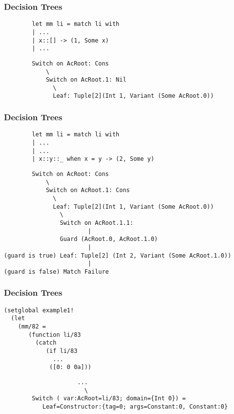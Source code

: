 \documentclass{beamer}
\begin{document}
\begin{frame}[fragile]
  \frametitle{Decision Trees}
  \begin{small}
    \hspace{-1em}
    \begin{minipage}{0.36\linewidth}
      \begin{lstlisting}
        let mm li = match li with
        | ...
        | x::[] -> (1, Some x)
        | ...
      \end{lstlisting}
      \hrulefill
      \begin{lstlisting}
        Switch on AcRoot: Cons
            \
            Switch on AcRoot.1: Nil
              \
              Leaf: Tuple[2](Int 1, Variant (Some AcRoot.0))
      \end{lstlisting}
    \end{minipage}
  \end{small}
\end{frame}
\begin{frame}[fragile]
  \frametitle{Decision Trees}
  \begin{small}
    \hspace{-1em}
    \begin{minipage}{0.36\linewidth}
      \begin{lstlisting}
        let mm li = match li with
        | ...
        | ...
        | x::y::_ when x = y -> (2, Some y)
      \end{lstlisting}
      \hrulefill
      \begin{lstlisting}
        Switch on AcRoot: Cons
            \
            Switch on AcRoot.1: Cons
              \
              Leaf: Tuple[2](Int 1, Variant (Some AcRoot.0))
                \
                Switch on AcRoot.1.1:
                        |
                Guard (AcRoot.0, AcRoot.1.0)
                        |
(guard is true) Leaf: Tuple[2] (Int 2, Variant (Some AcRoot.1.0))
                        |
(guard is false) Match Failure
      \end{lstlisting}
    \end{minipage}
  \end{small}
\end{frame}

\begin{frame}[fragile]
  \frametitle{Decision Trees}
  \begin{small}
    \hspace{-1em}
    \begin{minipage}{0.36\linewidth}
      \begin{lstlisting}
(setglobal example1!
  (let
    (mm/82 =
       (function li/83
         (catch
            (if li/83
              ...
             ([0: 0 0a]))
      \end{lstlisting}
      \hrulefill
      \begin{lstlisting}
                     ...
                       \
        Switch ( var:AcRoot=li/83; domain={Int 0}) =
           Leaf=Constructor:{tag=0; args=Constant:0, Constant:0}
      \end{lstlisting}
    \end{minipage}
  \end{small}
\end{frame}
\end{document}
